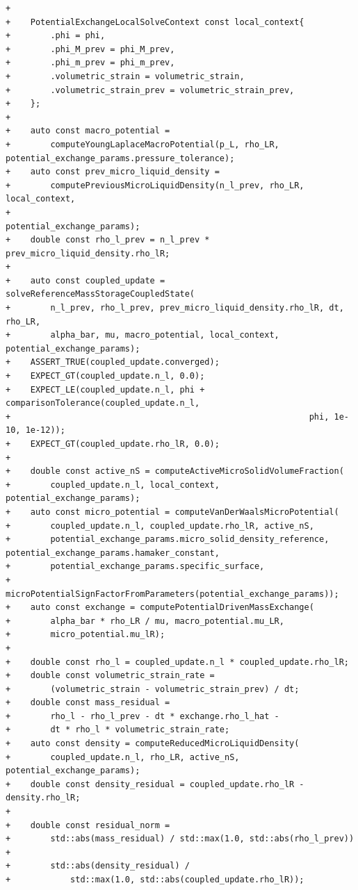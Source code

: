 \documentclass[10pt]{article}
\begin{document}
\begin{lstlisting}
+
+    PotentialExchangeLocalSolveContext const local_context{
+        .phi = phi,
+        .phi_M_prev = phi_M_prev,
+        .phi_m_prev = phi_m_prev,
+        .volumetric_strain = volumetric_strain,
+        .volumetric_strain_prev = volumetric_strain_prev,
+    };
+
+    auto const macro_potential =
+        computeYoungLaplaceMacroPotential(p_L, rho_LR, potential_exchange_params.pressure_tolerance);
+    auto const prev_micro_liquid_density =
+        computePreviousMicroLiquidDensity(n_l_prev, rho_LR, local_context,
+                                            potential_exchange_params);
+    double const rho_l_prev = n_l_prev * prev_micro_liquid_density.rho_lR;
+
+    auto const coupled_update = solveReferenceMassStorageCoupledState(
+        n_l_prev, rho_l_prev, prev_micro_liquid_density.rho_lR, dt, rho_LR,
+        alpha_bar, mu, macro_potential, local_context, potential_exchange_params);
+    ASSERT_TRUE(coupled_update.converged);
+    EXPECT_GT(coupled_update.n_l, 0.0);
+    EXPECT_LE(coupled_update.n_l, phi + comparisonTolerance(coupled_update.n_l,
+                                                            phi, 1e-10, 1e-12));
+    EXPECT_GT(coupled_update.rho_lR, 0.0);
+
+    double const active_nS = computeActiveMicroSolidVolumeFraction(
+        coupled_update.n_l, local_context, potential_exchange_params);
+    auto const micro_potential = computeVanDerWaalsMicroPotential(
+        coupled_update.n_l, coupled_update.rho_lR, active_nS,
+        potential_exchange_params.micro_solid_density_reference, potential_exchange_params.hamaker_constant,
+        potential_exchange_params.specific_surface,
+        microPotentialSignFactorFromParameters(potential_exchange_params));
+    auto const exchange = computePotentialDrivenMassExchange(
+        alpha_bar * rho_LR / mu, macro_potential.mu_LR,
+        micro_potential.mu_lR);
+
+    double const rho_l = coupled_update.n_l * coupled_update.rho_lR;
+    double const volumetric_strain_rate =
+        (volumetric_strain - volumetric_strain_prev) / dt;
+    double const mass_residual =
+        rho_l - rho_l_prev - dt * exchange.rho_l_hat -
+        dt * rho_l * volumetric_strain_rate;
+    auto const density = computeReducedMicroLiquidDensity(
+        coupled_update.n_l, rho_LR, active_nS, potential_exchange_params);
+    double const density_residual = coupled_update.rho_lR - density.rho_lR;
+
+    double const residual_norm =
+        std::abs(mass_residual) / std::max(1.0, std::abs(rho_l_prev)) +
+        std::abs(density_residual) /
+            std::max(1.0, std::abs(coupled_update.rho_lR));

\end{lstlisting}
\end{document}
